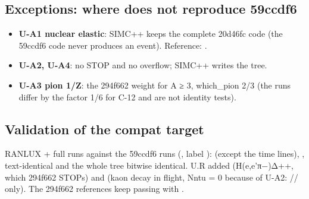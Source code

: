 \subsection*{\texorpdfstring{Exceptions: where  does not reproduce 59ccdf6}{Exceptions: where -{}-fortran-compat does not reproduce 59ccdf6}}\label{translation_report-07u5ffollowingu5fupstream:exceptions-where---fortran-compat-does-not-reproduce-59ccdf6}
\begin{itemize}
\item \textbf{U-A1 nuclear elastic}: SIMC++ keeps the complete 20d46fc code (the 59ccdf6 code never produces an event). Reference:
.
\item \textbf{U-A2, U-A4}: no STOP and no overflow; SIMC++ writes the tree.
\item \textbf{U-A3 pion 1/Z}: the 294f662 weight for A ≥ 3, which\_pion 2/3 (the runs  differ by the
factor 1/6 for C-12 and are not identity tests).
\end{itemize}
\subsection*{\texorpdfstring{Validation of the compat target}{Validation of the compat target}}\label{translation_report-07u5ffollowingu5fupstream:validation-of-the-compat-target}
RANLUX +  full runs against the 59ccdf6 runs (, label ):
 (except the time lines), ,  text-identical and the whole tree bitwise identical. U.R added
 (H(e,\allowbreak{}e'π−)Δ++,\allowbreak{} which 294f662 STOPs) and  (kaon decay in
flight, Nntu = 0 because of U-A2: // only). The 294f662 references keep passing with
.

